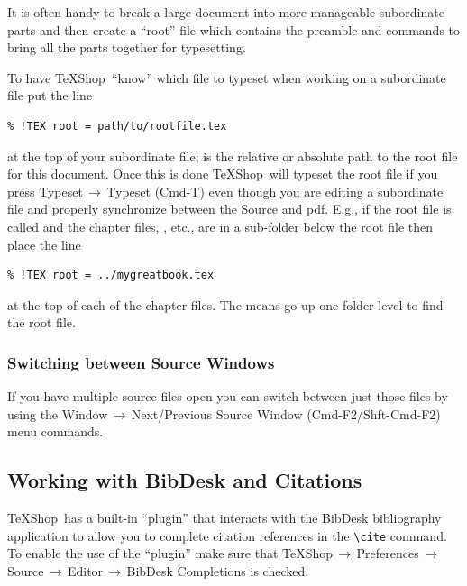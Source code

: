 \documentclass[letterpaper,11pt]{article}
\newcommand{\TS}{\textsf{\TeX Shop}}
\newcommand{\acr}[1]{\textsf{#1}}
\newcommand{\cmd}[1]{\textsf{#1}}
\newcommand{\mnu}[1]{\textsf{#1}}
\newcommand{\To}{\,\(\to\)\,}
\begin{document}
It is often handy to break a large document into more manageable subordinate parts and then create a ``root'' file which contains the preamble and \verb|| commands to bring all the parts together for typesetting.

To have \TS\ ``know'' which file to typeset when working on a subordinate file put the line
\begin{verbatim}
% !TEX root = path/to/rootfile.tex
\end{verbatim}
at the top of your subordinate file;  is the relative or absolute path to the root file for this document. Once this is done \TS\ will typeset the root file if you press \mnu{Typeset}\To\mnu{Typeset} (\cmd{Cmd-T}) even though you are editing a subordinate file and properly synchronize between the Source and \acr{pdf}. E.g., if the root file is called  and the chapter files, , etc., are in a  sub-folder below the root file then place the line
\begin{verbatim}
% !TEX root = ../mygreatbook.tex
\end{verbatim}
at the top of each of the chapter files. The  means go up one folder level to find the root file.

\subsubsection{Switching between Source Windows}

If you have multiple source files open you can switch between just those files by using the \mnu{Window}\To\mnu{Next/Previous Source Window} (\cmd{Cmd-F2}/\cmd{Shft-Cmd-F2}) menu commands.

\subsection{Working with \cmd{BibDesk} and Citations}

\TS\ has a built-in ``plugin'' that interacts with the \cmd{BibDesk} bibliography application to allow you to complete citation references in the \verb|\cite| command.  To enable the use of the ``plugin'' make sure that \mnu{TeXShop}\To\mnu{Preferences}\To\mnu{Source}\To\mnu{Editor}\To\mnu{BibDesk Completions} is checked. 
\end{document}
